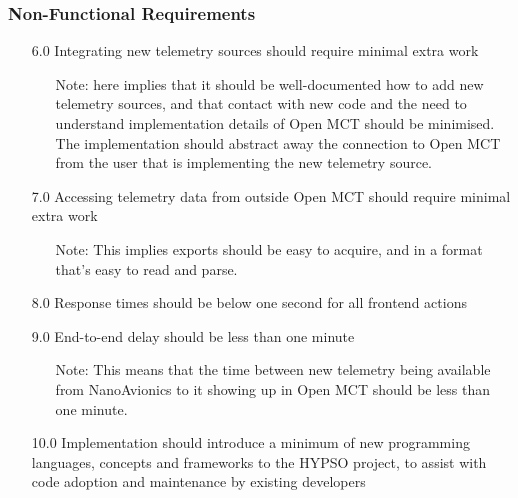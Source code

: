 \subsubsection{Non-Functional Requirements}
\begin{enumerate}
  \item[6.0] Integrating new telemetry sources should require minimal extra work
  \begin{itemize}
    \item[Note:]  here implies that it should be well-documented how to add new telemetry sources, and that contact with new code and the need to understand implementation details of Open MCT should be minimised. The implementation should abstract away the connection to Open MCT from the user that is implementing the new telemetry source.
  \end{itemize}
  \item[7.0] Accessing telemetry data from outside Open MCT should require minimal extra work
  \begin{itemize}
    \item[Note:] This implies exports should be easy to acquire, and in a format that's easy to read and parse.
  \end{itemize}
  \item[8.0] Response times should be below one second for all \gls{frontend} actions
  \item[9.0] End-to-end delay should be less than one minute
  \begin{itemize}
    \item[Note:] This means that the time between new telemetry being available from NanoAvionics to it showing up in Open MCT should be less than one minute.
  \end{itemize}
  \item[10.0] Implementation should introduce a minimum of new programming languages, concepts and frameworks to the HYPSO project, to assist with code adoption and maintenance by existing developers
\end{enumerate}